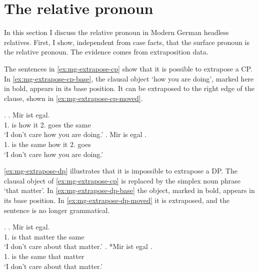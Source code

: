 \section{The relative pronoun}\label{sec:mg-rel}

In this section I discuss the relative pronoun in Modern German headless relatives.
First, I show, independent from case facts, that the surface pronoun is the relative pronoun. The evidence comes from extraposition data.

The sentences in \ref{ex:mg-extrapose-cp} show that it is possible to extrapose a CP. In \ref{ex:mg-extrapose-cp-base}, the clausal object  `how you are doing', marked here in bold, appears in its base position. It can be extraposed to the right edge of the clause, shown in \ref{ex:mg-extrapose-cp-moved}.

\ex.\label{ex:mg-extrapose-cp}
\ag. Mir ist     egal.\\
1. is how it 2. goes {the same}\\
`I don't care how you are doing.'\label{ex:mg-extrapose-cp-base}
\bg. Mir is egal    .\\
1. is {the same} how it 2. goes\\
`I don't care how you are doing.' \label{ex:mg-extrapose-cp-moved}

\ref{ex:mg-extrapose-dp} illustrates that it is impossible to extrapose a DP. The clausal object of \ref{ex:mg-extrapose-cp} is replaced by the simplex noun phrase  `that matter'.
In \ref{ex:mg-extrapose-dp-base} the object, marked in bold, appears in its base position. In \ref{ex:mg-extrapose-dp-moved} it is extraposed, and the sentence is no longer grammatical.

\ex.\label{ex:mg-extrapose-dp}
\ag. Mir ist   egal.\\
1. is that matter {the same}\\
`I don't care about that matter.'\label{ex:mg-extrapose-dp-base}
\bg. *Mir ist egal  .\\
1. is {the same} that matter\\
`I don't care about that matter.' \label{ex:mg-extrapose-dp-moved}

